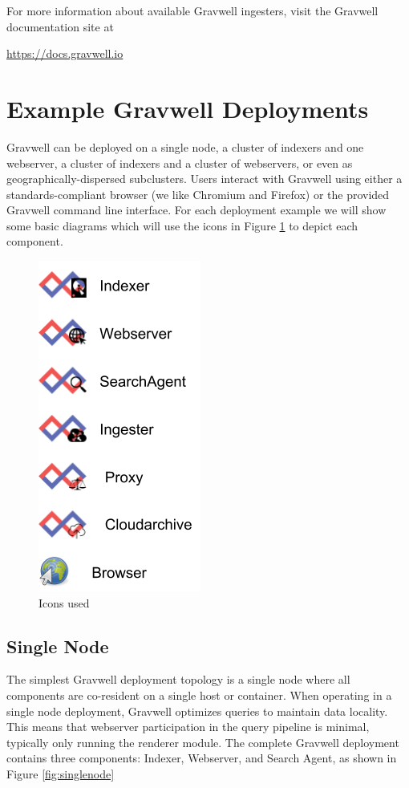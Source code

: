For more information about available
Gravwell ingesters, visit the Gravwell documentation site at
{\href{https://docs.gravwell.io}{https://docs.gravwell.io}

\section{Example Gravwell Deployments}

Gravwell can be deployed on a single node, a cluster of indexers and one webserver, a
cluster of indexers and a cluster of webservers, or even as geographically-dispersed subclusters.
Users interact with Gravwell using either a standards-compliant browser
(we like Chromium and Firefox) or the provided Gravwell command line
interface. For each deployment example we will show some basic diagrams
which will use the icons in Figure \ref{fig:archicons} to depict each component.

\begin{figure}
	\includegraphics[width=0.3\linewidth]{images/archicons.png}
	\caption{Icons used}
	\label{fig:archicons}
\end{figure}

\subsection{Single Node}

The simplest Gravwell deployment topology is a single node where all
components are co-resident on a single host or container. When
operating in a single node deployment, Gravwell optimizes queries to
maintain data locality. This means that webserver participation in the
query pipeline is minimal, typically only running the renderer module.
The complete Gravwell deployment contains three components: Indexer,
Webserver, and Search Agent, as shown in Figure \ref{fig:singlenode}

}
